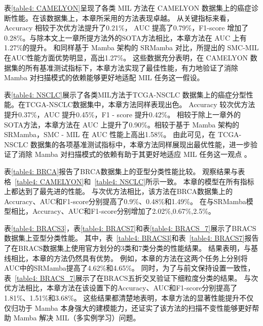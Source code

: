 

表\ref{table4: CAMELYON}呈现了各类 MIL 方法在 CAMELYON 数据集上的癌症诊断性能。在该数据集上，本章所采用的方法表现卓越。
从关键指标来看，Accuracy 相较于次优方法提升了0.21\%，
AUC 提高了0.79\%，F1-score 增加了0.28\%。与除本文上一章所提方法外的SOTA方法相比，本章方法在 AUC 上有1.27\%的提升。
和同样基于 Mamba 架构的 SRMamba 对比，所提出的 SMC-MIL 在AUC性能方面优势明显，高出1.27\%。
这些数据充分表明，在 CAMELYON 数据集的所有基准测试指标下，本章方法实现了最佳性能，有力地验证了消除 Mamba 对扫描模式的依赖能够更好地适配 MIL 任务这一假设。

表\ref{table4: NSCLC}展示了各类MIL方法于TCGA-NSCLC 数据集上的癌症分型性能。在TCGA-NSCLC数据集中，本章方法同样表现出色。
Accuracy 较次优方法提升0.37\%，AUC 提升0.45\%，F1 - score 提升0.42\%。
相较于除上一章外的SOTA方法，本章方法在 AUC 上提升了0.90\%。相较于基于 Mamba 架构的 SRMamba，SMC - MIL 在 AUC 性能上高出1.58\%。
由此可见，在 TCGA-NSCLC 数据集的各项基准测试指标中，本章方法同样展现出最优性能，进一步验证了消除 Mamba 对扫描模式的依赖有助于其更好地适应 MIL 任务这一观点 。


表\ref{table4: BRCA}报告了BRCA数据集上的亚型分类性能比较。
观察结果与表格~\ref{table4: CAMELYON}和~\ref{table4: NSCLC}所示一致。
本章的模型在所有指标上都达到了最先进的性能。
与次优方法相比，该方法在BRCA数据集上的Accuracy、AUC和F1-score分别提高了0.9\%、0.48\%和1.49\%。
在与SRMamba模型相比，Accuracy、AUC和F1-score分别增加了2.02\%,0.67\%,2.5\%。


表\ref{table4: BRACS3}，表\ref{table4: BRACS7}和表\ref{table4: BRACS_7}展示了BRACS数据集上亚型分类性能。
其中，表~\ref{table4: BRACS3}和表~\ref{table4: BRACS7}报告了在BRACS数据集上使用官方划分的3类和7类分类的性能结果。
结果表明，与基线相比，本章的方法仍然具有优势。
例如，本章的方法在这两个任务上分别将AUC中的SRMamba提高了4.62\%和4.65\%。
同时，为了与前文保持设置一致性，表~\ref{table4: BRACS_7}展示了在BRACS五折交叉验证下细粒度分类的结果。
与次优方法相比，本章方法在该设置下的Accuracy、AUC和F1-score分别提高了1.81\%、1.51\%和3.68\%。
这些结果都清楚地表明，本章方法的显著性能提升不仅仅归功于 Mamba 本身强大的建模能力，还证实了该方法的扫描不变性能够更好帮助 Mamba 解决 MIL（多实例学习）问题。

